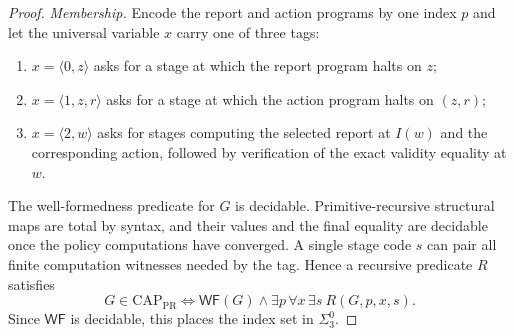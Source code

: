 \documentclass[11pt]{article}
\theoremstyle{plain}
\theoremstyle{definition}
\theoremstyle{remark}
\begin{document}
\begin{proof}
\emph{Membership.} Encode the report and action programs by one index $p$ and
let the universal variable $x$ carry one of three tags:
\begin{enumerate}[label=(\alph*)]
\item $x=\langle0,z\rangle$ asks for a stage at which the report program halts
on $z$;
\item $x=\langle1,z,r\rangle$ asks for a stage at which the action program
halts on $(z,r)$;
\item $x=\langle2,w\rangle$ asks for stages computing the selected report at
$I(w)$ and the corresponding action, followed by verification of the exact
validity equality at $w$.
\end{enumerate}
The well-formedness predicate for $G$ is decidable. Primitive-recursive
structural maps are total by syntax, and their values and the final equality are
decidable once the policy computations have converged. A single stage code $s$
can pair all finite computation witnesses needed by the tag. Hence a recursive
predicate $R$ satisfies
\[
G\in\mathrm{CAP}_{\mathrm{PR}}
\iff
\mathsf{WF}(G)\land\exists p\,\forall x\,\exists s\ R(G,p,x,s).
\]
Since $\mathsf{WF}$ is decidable, this places the index set in $\Sigma^0_3$.


\end{proof}
\end{document}
